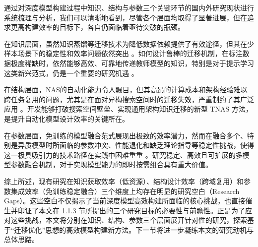 \documentclass[../main.tex]{subfiles}
\begin{document}

通过对深度模型构建过程中知识、结构与参数三个关键环节的国内外研究现状进行系统梳理与分析，我们可以清晰地看到，尽管各个层面均取得了显著进展，但在追求更高构建效率的目标下，各自仍面临着亟待突破的瓶颈。

在知识层面，虽然知识蒸馏等迁移技术为降低数据依赖提供了有效途径，但其在少样本场景下的稳定性和效率问题依然突出 。如何设计鲁棒的迁移机制，在标注数据极度稀缺时，依然能够高效、可靠地传递教师模型的知识，特别是对于提示学习这类新兴范式，仍是一个重要的研究机遇 。

在结构层面，NAS的自动化能力令人瞩目，但其高昂的计算成本和架构经验难以跨任务复用的问题，尤其是在面对异构搜索空间时的迁移失效，严重制约了其广泛应用 。开发能够打破搜索空间壁垒、实现通用架构知识迁移的新型 TNAS 方法，是提升自动化模型设计效率的关键所在。

在参数层面，免训练的模型融合范式展现出极致的效率潜力，然而在融合多个、特别是异质模型时所面临的参数冲突、性能退化和缺乏理论指导等稳定性挑战，使得这一极具吸引力的技术路径在实践中困难重重 。研究稳定、高效且可扩展的多模型参数融合机制，对于实现模型能力的即时按需组合具有重大价值。

综上所述，现有研究在知识获取效率（低资源）、结构设计效率（跨域复用）和参数集成效率（免训练稳定融合）三个维度上均存在明显的研究空白（Research Gaps）。这些空白不仅揭示了当前深度模型高效构建所面临的核心挑战，也直接催生并印证了本文在 1.1.3 节所提出的三个研究目标的必要性与前瞻性。正是为了应对这些挑战，本文将分别在知识、结构、参数三个层面展开针对性的研究，探索基于“迁移优化”思想的高效模型构建新方法。下一节将进一步凝练本文的研究动机与总体思路。
\end{document}
